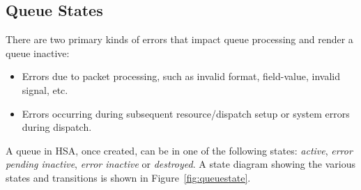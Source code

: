 \documentclass[draft]{book}
\begin{document}
\hypertarget{queue-errors}{}\subsection{Queue States} \label{queue-errors}

There are two primary kinds of errors that impact queue processing and render a
queue inactive:
\begin{itemize}
\item Errors due to packet processing, such as invalid format, field-value,
  invalid signal, etc.
\item Errors occurring during subsequent resource/dispatch setup or system
  errors during dispatch.
\end{itemize}

A queue in HSA, once created, can be in one of the following states:
\emph{active}, \emph{error pending inactive}, \emph{error inactive} or
\emph{destroyed}. A state diagram showing the various states and transitions is
shown in Figure~\ref{fig:queuestate}.
\end{document}
